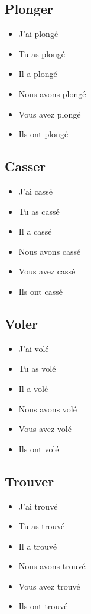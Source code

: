 \subsection{Plonger}

\begin{itemize}
    \item J'ai plongé 
    \item Tu as plongé 
    \item Il a plongé 
    \item Nous avons plongé 
    \item Vous avez plongé
    \item Ils ont plongé 
\end{itemize}

\subsection{Casser}

\begin{itemize}
    \item J'ai cassé 
    \item Tu as cassé 
    \item Il a cassé 
    \item Nous avons cassé 
    \item Vous avez cassé 
    \item Ils ont cassé 
\end{itemize}

\subsection{Voler}

\begin{itemize}
    \item J'ai volé
    \item Tu as volé 
    \item Il a volé 
    \item Nous avons volé 
    \item Vous avez volé 
    \item Ils ont volé 
\end{itemize}

\subsection{Trouver}

\begin{itemize}
    \item J'ai trouvé 
    \item Tu as trouvé 
    \item Il a trouvé 
    \item Nous avons trouvé 
    \item Vous avez trouvé 
    \item Ils ont trouvé
\end{itemize}